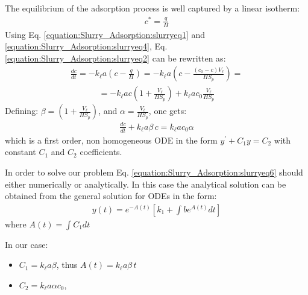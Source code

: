 \documentclass[letterpaper,10pt,english]{jupyterBook}
\begin{document}
\sphinxAtStartPar
The equilibrium of the adsorption process is well captured by a linear isotherm:
\begin{equation}\label{equation:Slurry_Adsorption:slurryeq4}
\begin{split}
c^*=\frac{q}{H}
\label{eq:equilibrium}
\end{split}
\end{equation}
\sphinxAtStartPar
Using Eq. \eqref{equation:Slurry_Adsorption:slurryeq1} and \eqref{equation:Slurry_Adsorption:slurryeq4}, Eq. \eqref{equation:Slurry_Adsorption:slurryeq2} can be rewritten as:
\begin{equation*}
\begin{split}
\frac{dc}{dt}=-k_\ell{a}\left(c-\frac{q}{H}\right) = -k_\ell{a}\left(c-\frac{(c_0-c)V_\ell}{HS_p}\right) = 
\end{split}
\end{equation*}\begin{equation}\label{equation:Slurry_Adsorption:slurryeq5}
\begin{split}
=-k_\ell{a}c\left(1+\frac{V_\ell}{HS_p}\right)+k_\ell{a}c_0\frac{V_\ell}{HS_p}
\end{split}
\end{equation}
\sphinxAtStartPar
Defining: \(\beta=\left(1+\frac{V_\ell}{HS_p}\right)\), and \(\alpha=\frac{V_\ell}{HS_p}\), one gets:
\begin{equation}\label{equation:Slurry_Adsorption:slurryeq6}
\begin{split}
\frac{dc}{dt}+k_\ell{a}\beta\,c=k_\ell{a}c_0\alpha
\end{split}
\end{equation}
\sphinxAtStartPar
which is a first order, non homogeneous ODE in the form \(y^\prime+C_1y=C_2\) with constant \(C_1\) and \(C_2\) coefficients.

\sphinxAtStartPar
In order to solve our problem Eq. \eqref{equation:Slurry_Adsorption:slurryeq6} should either numerically or analytically.
In this case the analytical solution can be obtained from the general solution for ODEs in the form:
\begin{equation}\label{equation:Slurry_Adsorption:slurryeq7}
\begin{split}
y(t)=e^{-A(t)}\left[k_1+\int{be^{A(t)}dt}\right]
\end{split}
\end{equation}
\sphinxAtStartPar
where \(A(t)=\int{C_1dt}\)

\sphinxAtStartPar
In our case:
\begin{itemize}
\item {} 
\sphinxAtStartPar
\(C_1=k_\ell{a\beta}\), thus \(A(t)=k_\ell{a\beta}\,t\)

\item {} 
\sphinxAtStartPar
\(C_2=k_\ell{a\alpha}c_0\),

\end{itemize}
\end{document}
